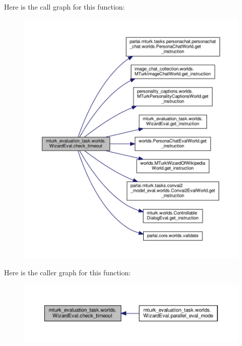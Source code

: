 Here is the call graph for this function\+:
\nopagebreak
\begin{figure}[H]
\begin{center}
\leavevmode
\includegraphics[width=350pt]{classmturk__evaluation__task_1_1worlds_1_1WizardEval_aa7477247b6a732f69d461fca5c02945a_cgraph}
\end{center}
\end{figure}
Here is the caller graph for this function\+:
\nopagebreak
\begin{figure}[H]
\begin{center}
\leavevmode
\includegraphics[width=350pt]{classmturk__evaluation__task_1_1worlds_1_1WizardEval_aa7477247b6a732f69d461fca5c02945a_icgraph}
\end{center}
\end{figure}
\mbox{\label{classmturk__evaluation__task_1_1worlds_1_1WizardEval_a99651f189139f9b7d2cd63375b6328b5}} 
